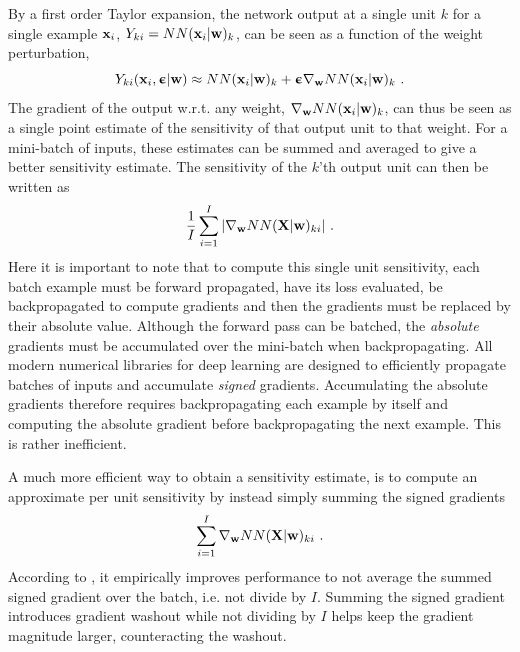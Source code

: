 By a first order Taylor expansion, the network output at a single unit $k$ for a single example ${\mathbf{x}}_i$, $Y_{ki}=NN({\mathbf{x}}_{i}|{\mathbf{w}})_k$, can be seen as a function of the weight perturbation,
\begin{equation}
    Y_{ki}({\mathbf{x}}_i,{\boldsymbol{\upepsilon}}|{\mathbf{w}}) \approx NN({\mathbf{x}}_{i}|{\mathbf{w}})_k + {\boldsymbol{\upepsilon}}\nabla_{\mathbf{w}} NN({\mathbf{x}}_{i}|{\mathbf{w}})_k \ .
\end{equation}
The gradient of the output w.r.t. any weight, $\nabla_{\mathbf{w}} NN({\mathbf{x}}_{i}|{\mathbf{w}})_k$, can thus be seen as a single point estimate of the sensitivity of that output unit to that weight. For a mini-batch of inputs, these estimates can be summed and averaged to give a better sensitivity estimate. The sensitivity of the $k$'th output unit can then be written as
\begin{equation*}
     \frac{1}{I}\sum_{i=1}^I {\left\lvert\nabla_{\mathbf{w}} NN({\mathbf{X}}|{\mathbf{w}})_{ki}\right\rvert} \ .
\end{equation*}
Here it is important to note that to compute this single unit sensitivity, each batch example must be forward propagated, have its loss evaluated, be backpropagated to compute gradients and then the gradients must be replaced by their absolute value. Although the forward pass can be batched, the \emph{absolute} gradients must be accumulated over the mini-batch when backpropagating. All modern numerical libraries for deep learning are designed to efficiently propagate batches of inputs and accumulate \emph{signed} gradients. Accumulating the absolute gradients therefore requires backpropagating each example by itself and computing the absolute gradient before backpropagating the next example. This is rather inefficient.

A much more efficient way to obtain a sensitivity estimate, is to compute an approximate per unit sensitivity by instead simply summing the signed gradients
\begin{equation*}
     \sum_{i=1}^I \nabla_{\mathbf{w}} NN({\mathbf{X}}|{\mathbf{w}})_{ki} \ .
\end{equation*}
According to \cite{Lehman2017a}, it empirically improves performance to not average the summed signed gradient over the batch, i.e. not divide by $I$. Summing the signed gradient introduces gradient washout while not dividing by $I$ helps keep the gradient magnitude larger, counteracting the washout.

